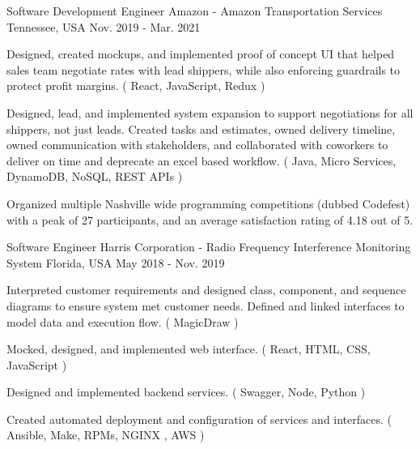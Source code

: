 \begin{cventries}
  \cventry
    {Software Development Engineer} %
    {Amazon - Amazon Transportation Services} %
    {Tennessee, USA} %
    {Nov. 2019 - Mar. 2021} %
    {
      \begin{cvitems} %
        \item {Designed, created mockups, and implemented proof of concept UI that helped sales team negotiate rates with lead shippers, while also enforcing guardrails to protect profit margins. ( React, JavaScript, Redux )}
        \item {Designed, lead, and implemented system expansion to support negotiations for all shippers, not just leads. Created tasks and estimates, owned delivery timeline, owned communication with stakeholders, and collaborated with coworkers to deliver on time and deprecate an excel based workflow. ( Java, Micro Services, DynamoDB, NoSQL, REST APIs )}
        \item {Organized multiple Nashville wide programming competitions (dubbed Codefest) with a peak of 27 participants, and an average satisfaction rating of 4.18 out of 5.}
      \end{cvitems}
    }

  \cventry
    {Software Engineer} %
    {Harris Corporation - Radio Frequency Interference Monitoring System} %
    {Florida, USA} %
    {May 2018 - Nov. 2019} %
    {
      \begin{cvitems} %
        \item {Interpreted customer requirements and designed class, component, and sequence diagrams to ensure system met customer needs. Defined and linked interfaces to model data and execution flow. ( MagicDraw )}
        \item {Mocked, designed, and implemented web interface. ( React, HTML, CSS, JavaScript )}
        \item {Designed and implemented backend services. ( Swagger, Node, Python )}
        \item {Created automated deployment and configuration of services and interfaces. ( Ansible, Make, RPMs, NGINX , AWS )}
      \end{cvitems}
    }

\end{cventries}
